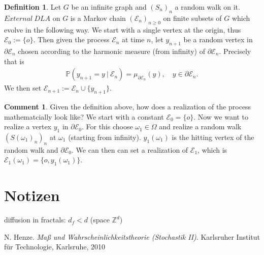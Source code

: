 \documentclass[12pt,a4paper]{scrartcl}
\numberwithin{equation}{section}
\numberwithin{equation}{section}%
\theoremstyle{definition}
\newtheorem{definition}[theorem]{Definition}
\theoremstyle{definition}
\newtheorem{com}[thm]{Comment}
\begin{document}
\begin{definition}
	Let $G$ be an infinite graph and $(S_n)_n$ a random walk on it. $External\ DLA$ on $G$ is a Markov chain $(\mathcal{E}_n)_{n\geq 0}$ on finite subsets of $G$ which evolve in the following way. We start with a single vertex at the origin, thus $\mathcal{E}_0 := \{o\}$. Then given the process $\mathcal{E}_n$ at time $n$, let $y_{n+1}$ be a random vertex in $\partial \mathcal{E}_n$ chosen according to the harmonic measure (from infinity) of $\partial \mathcal{E}_n$. Precisely that is
	\begin{align*}
		\mathbb{P}(y_{n+1}=y\ |\ \mathcal{E}_n) = \mu_{\partial \mathcal{E}_n}(y),\quad y\in \partial \mathcal{E}_n.
	\end{align*}
	We then set $\mathcal{E}_{n+1} := \mathcal{E}_n \cup \{y_{n+1}\}$.	
	
\end{definition}

\begin{com}
	Given the definition above, how does a realization of the process mathematcially look like? We start with a constant $\mathcal{E}_0 = \{o\}$. Now we want to realize a vertex $y_1$ in $\partial \mathcal{E}_0$. For this choose $\omega_1\in \Omega$ and realize a random walk $(S(\omega_1)_n)_n$ at $\omega_1$ (starting from infinity). $y_1(\omega_1)$ is the hitting vertex of the random walk and $\partial \mathcal{E}_0$. We can then can set a realization of $\mathcal{E}_1$, which is $\mathcal{E}_1(\omega_1)=\{o,y_1(\omega_1)\}$. 
\end{com}



\newpage

\section{Notizen}

diffusion in fractals: $d_f < d$ (space $\mathbb{Z}^d$)


\newpage


\begin{thebibliography}{Lam00}
\thispagestyle{empty}

N. Henze.
\emph{Maß und Wahrscheinlichkeitstheorie (Stochastik II)}.
Karlsruher Institut für Technologie, Karlsruhe, 2010

\end{thebibliography}

\newpage
  
\thispagestyle{empty}
\end{document}
